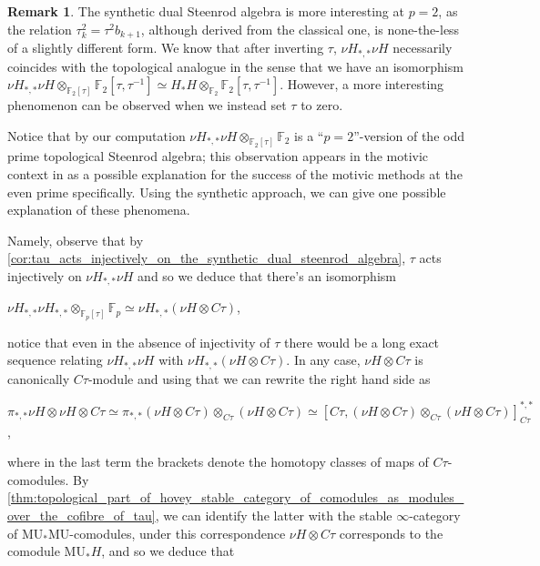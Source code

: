 \documentclass[oneside,a4paper]{amsart}
\newcommand{\MU}{\mathrm{MU}} %
\newcommand{\fieldp}{\mathbb{F}_{p}} %
\newcommand{\fieldtwo}{\mathbb{F}_{2}} %
\theoremstyle{plain}
\theoremstyle{definition}
\newtheorem{rem}[thm]{Remark}
\theoremstyle{remark}
\begin{document}
\begin{rem}
\label{rem:form_of_synthetic_dual_steenrod_algebra_after_killing_tau_at_even_prime}
The synthetic dual Steenrod algebra is more interesting at $p = 2$, as the relation $\tau_{k}^{2} = \tau^{2} b_{k+1}$, although derived from the classical one, is none-the-less of a slightly different form. We know that after inverting $\tau$, $\nu H_{*, *} \nu H$ necessarily coincides with the topological analogue in the sense that we have an isomorphism $\nu H_{*, *} \nu H \otimes _{\fieldtwo[\tau]} \fieldtwo[\tau, \tau^{-1}] \simeq H_{*} H \otimes _{\fieldtwo} \fieldtwo[\tau, \tau^{-1}]$. However, a more interesting phenomenon can be observed when we instead set $\tau$ to zero. 

Notice that by our computation $\nu H_{*, *} \nu H \otimes _{\fieldtwo[\tau]} \fieldtwo$ is a ``$p = 2$''-version of the odd prime topological Steenrod algebra; this observation appears in the motivic context in \cite{isaksen_stable_stems} as a possible explanation for the success of the motivic methods at the even prime specifically. Using the synthetic approach, we can give one possible explanation of these phenomena.

Namely, observe that by \cref{cor:tau_acts_injectively_on_the_synthetic_dual_steenrod_algebra}, $\tau$ acts injectively on $\nu H_{*, *} \nu H$ and so we deduce that there's an isomorphism 

\begin{center}
$\nu H_{*, *} \nu H_{*, *} \otimes _{\fieldp[\tau]} \fieldp \simeq \nu H_{*, *} (\nu H \otimes C\tau)$, 
\end{center}
notice that even in the absence of injectivity of $\tau$ there would be a long exact sequence relating $\nu H_{*, *} \nu H$ with $\nu H_{*, *} (\nu H \otimes C\tau)$. In any case, $\nu H \otimes C\tau$ is canonically $C\tau$-module and using that we can rewrite the right hand side as 

\begin{center}
$\pi_{*, *} \nu H \otimes \nu H \otimes C\tau \simeq \pi_{*, *} (\nu H \otimes C\tau) \otimes _{C\tau} (\nu H \otimes C\tau) \simeq [C\tau, (\nu H \otimes C\tau) \otimes _{C\tau} (\nu H \otimes C\tau)]_{C\tau}^{*, *}$,
\end{center}
where in the last term the brackets denote the homotopy classes of maps of $C\tau$-comodules. By \cref{thm:topological_part_of_hovey_stable_category_of_comodules_as_modules_over_the_cofibre_of_tau}, we can identify the latter with the stable $\infty$-category of $\MU_{*}\MU$-comodules, under this correspondence $\nu H \otimes C\tau$ corresponds to the comodule $\MU_{*}H$, and so we deduce that 


\end{rem}
\end{document}
